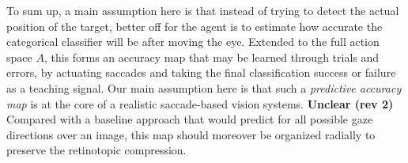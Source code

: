 To sum up, a main assumption here is that instead of trying to detect the actual position of the target, better off for the agent is to estimate how accurate the categorical classifier will be after moving the eye. Extended to the full action space $A$, this forms an accuracy map that may be learned through trials and errors, by actuating saccades %
and taking the final classification success or failure as a teaching signal.
Our main assumption here is that such a \emph{predictive accuracy map} is at the core of a realistic saccade-based vision systems.
{\color{red} \textbf{Unclear (rev 2)} Compared with a baseline approach that would predict for all possible gaze directions over an image}, this map should moreover be organized radially to preserve the retinotopic compression. 

